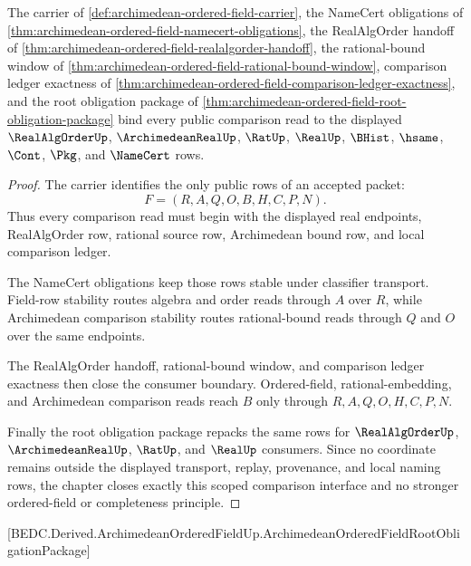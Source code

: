 \begin{theorem}
\label{thm:archimedean-ordered-field-scoped-closure}
The carrier of \autoref{def:archimedean-ordered-field-carrier}, the NameCert obligations of \autoref{thm:archimedean-ordered-field-namecert-obligations}, the RealAlgOrder handoff of \autoref{thm:archimedean-ordered-field-realalgorder-handoff}, the rational-bound window of \autoref{thm:archimedean-ordered-field-rational-bound-window}, comparison ledger exactness of \autoref{thm:archimedean-ordered-field-comparison-ledger-exactness}, and the root obligation package of \autoref{thm:archimedean-ordered-field-root-obligation-package} bind every public comparison read to the displayed $\RealAlgOrderUp$, $\ArchimedeanRealUp$, $\RatUp$, $\RealUp$, $\BHist$, $\hsame$, $\Cont$, $\Pkg$, and $\NameCert$ rows.
\end{theorem}
\begin{proof}
The carrier identifies the only public rows of an accepted packet:
$$
F=(R,A,Q,O,B,H,C,P,N).
$$
Thus every comparison read must begin with the displayed real endpoints, RealAlgOrder row, rational source row, Archimedean bound row, and local comparison ledger.

The NameCert obligations keep those rows stable under classifier transport. Field-row stability routes algebra and order reads through $A$ over $R$, while Archimedean comparison stability routes rational-bound reads through $Q$ and $O$ over the same endpoints.

The RealAlgOrder handoff, rational-bound window, and comparison ledger exactness then close the consumer boundary. Ordered-field, rational-embedding, and Archimedean comparison reads reach $B$ only through $R,A,Q,O,H,C,P,N$.

Finally the root obligation package repacks the same rows for $\RealAlgOrderUp$, $\ArchimedeanRealUp$, $\RatUp$, and $\RealUp$ consumers. Since no coordinate remains outside the displayed transport, replay, provenance, and local naming rows, the chapter closes exactly this scoped comparison interface and no stronger ordered-field or completeness principle.
\end{proof}

[BEDC.Derived.ArchimedeanOrderedFieldUp.ArchimedeanOrderedFieldRootObligationPackage]

